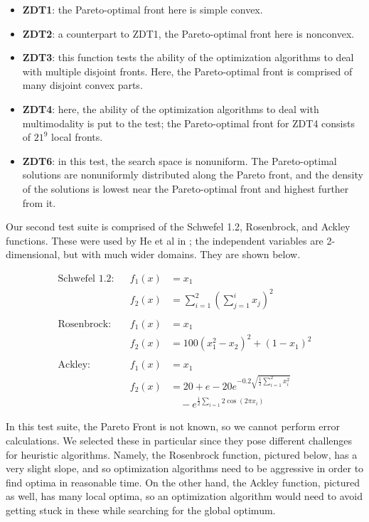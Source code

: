\documentclass[letterpaper, 10 pt, conference]{ieeeconf}  %
\begin{document}
\begin{itemize}
\item \textbf{ZDT1}: the Pareto-optimal front here is simple convex. 
\item \textbf{ZDT2}: a counterpart to ZDT1, the Pareto-optimal front here is nonconvex.
\item \textbf{ZDT3}: this function tests the ability of the optimization algorithms to deal with multiple disjoint fronts. Here, the Pareto-optimal front is comprised of many disjoint convex parts.
\item \textbf{ZDT4}: here, the ability of the optimization algorithms to deal with multimodality is put to the test; the Pareto-optimal front for ZDT4 consists of $21^9$ local fronts.
\item \textbf{ZDT6}: in this test, the search space is nonuniform. The Pareto-optimal solutions are nonuniformly distributed along the Pareto front, and the density of the solutions is lowest near the Pareto-optimal front and highest further from it.
\end{itemize}

Our second test suite is comprised of the Schwefel 1.2, Rosenbrock, and Ackley functions. These were used by He et al in \cite{RGOPaper}; the independent variables are 2-dimensional, but with much wider domains. They are shown below.

\begin{align*}
\text{Schwefel 1.2}: 	&	& f_1(x)	& = x_1 \\
	  			&	& f_2(x)	& = \sum_{i=1}^{2} \left( \sum_{j=1}^{i} x_j \right) ^2 \\
\\
\text{Rosenbrock}: 	&	& f_1(x)	& = x_1 \\
	  			&	& f_2(x)	& = 100 \left( x_1^2 - x_{2}\right)^2 + \left( 1 - x_1 \right)^2 \\
\\
\text{Ackley}: 		&	& f_1(x)	& = x_1 \\
	  			&	& f_2(x)	& = 20 + e - 20 e^{-0.2 \sqrt{\frac{1}{2} \sum_{i=1}^{2} x_i^2}} \\
				&	&	    	& \quad - e^{\frac{1}{2} \sum_{i=1}{2} \cos(2 \pi x_i)} 
\end{align*}

In this test suite, the Pareto Front is not known, so we cannot perform error calculations. We selected these in particular since they pose different challenges for heuristic algorithms. Namely, the Rosenbrock function, pictured below, has a very slight slope, and so optimization algorithms need to be aggressive in order to find optima in reasonable time. On the other hand, the Ackley function, pictured as well, has many local optima, so an optimization algorithm would need to avoid getting stuck in these while searching for the global optimum.
\end{document}
